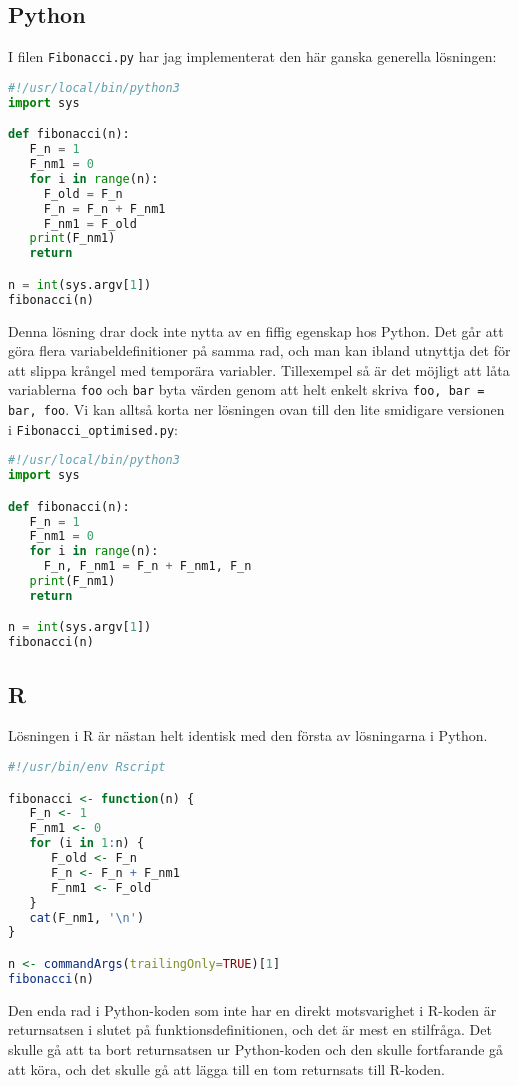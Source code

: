 \documentclass[10pt, twoside,a4paper]{article}
\begin{document}
\subsection{Python}
I filen \verb+Fibonacci.py+ har jag implementerat den här ganska generella lösningen: 
\begin{lstlisting}[language=python]
#!/usr/local/bin/python3
import sys

def fibonacci(n):
   F_n = 1
   F_nm1 = 0
   for i in range(n):
     F_old = F_n
     F_n = F_n + F_nm1
     F_nm1 = F_old
   print(F_nm1)
   return

n = int(sys.argv[1])
fibonacci(n)
\end{lstlisting}
Denna lösning drar dock inte nytta av en fiffig egenskap hos Python. Det går att göra flera variabeldefinitioner på samma rad, och man kan ibland utnyttja det för att slippa krångel med temporära variabler. Tillexempel så är det möjligt att låta variablerna \verb+foo+ och \verb+bar+ byta värden genom att helt enkelt skriva \verb+foo, bar = bar, foo+. Vi kan alltså korta ner lösningen ovan till den lite smidigare versionen i \verb+Fibonacci_optimised.py+:
\begin{lstlisting}[language=python]
#!/usr/local/bin/python3
import sys

def fibonacci(n):
   F_n = 1
   F_nm1 = 0
   for i in range(n):
     F_n, F_nm1 = F_n + F_nm1, F_n
   print(F_nm1)
   return

n = int(sys.argv[1])
fibonacci(n)
\end{lstlisting}

\newpage
\subsection{R}
Lösningen i R är nästan helt identisk med den första av lösningarna i Python. 
\begin{lstlisting}[language=R]
#!/usr/bin/env Rscript

fibonacci <- function(n) {
   F_n <- 1
   F_nm1 <- 0
   for (i in 1:n) {
      F_old <- F_n
      F_n <- F_n + F_nm1
      F_nm1 <- F_old
   }
   cat(F_nm1, '\n')
}

n <- commandArgs(trailingOnly=TRUE)[1]
fibonacci(n)
\end{lstlisting}
Den enda rad i Python-koden som inte har en direkt motsvarighet i R-koden är returnsatsen i slutet på funktionsdefinitionen, och det är mest en stilfråga. Det skulle gå att ta bort returnsatsen ur Python-koden och den skulle fortfarande gå att köra, och det skulle gå att lägga till en tom returnsats till R-koden.
\end{document}
